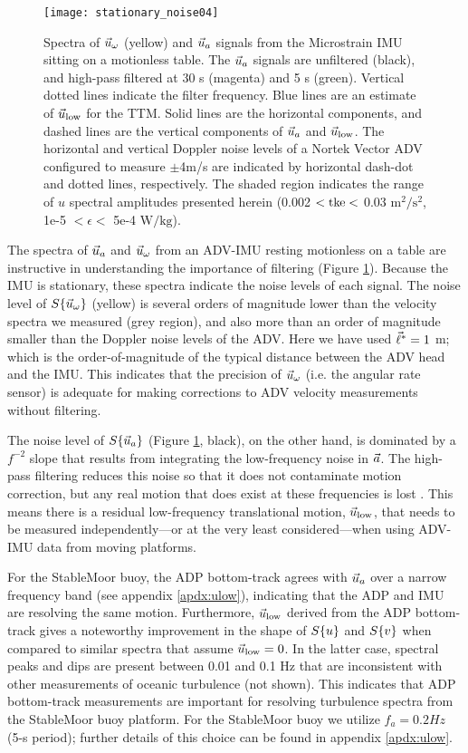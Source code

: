 \begin{figure}
  \centering
  \texttt{[image: stationary\_noise04]}
  \caption{Spectra of $\vec{u}_\omega$ (yellow) and $\vec{u}_a$ signals from the Microstrain IMU sitting on a motionless table. The $\vec{u}_a$ signals are unfiltered (black), and high-pass filtered at 30 s (magenta) and 5 s (green). Vertical dotted lines indicate the filter frequency.  Blue lines are an estimate of $\vec{u}_\mathrm{low}$ for the TTM. Solid lines are the horizontal components, and dashed lines are the vertical components of $\vec{u}_a$ and $\vec{u}_\mathrm{low}$. The horizontal and vertical Doppler noise levels of a Nortek Vector ADV configured to measure $\pm$4m/s are indicated by horizontal dash-dot and dotted lines, respectively. The shaded region indicates the range of $u$ spectral amplitudes presented herein (0.002 $< \mathrm{tke} <$ 0.03 $\mathrm{m^2/s^2}$, 1e-5 $< \epsilon <$ 5e-4 $\mathrm{W/kg}$).}
  \label{fig:stnoise}
\end{figure}

The spectra of $\vec{u}_a$ and $\vec{u}_\omega$ from an ADV-IMU resting motionless on a table are instructive in understanding the importance of filtering (Figure \ref{fig:stnoise}). Because the IMU is stationary, these spectra indicate the noise levels of each signal.  The noise level of $S\{\vec{u}_\omega\}$ (yellow) is several orders of magnitude lower than the velocity spectra we measured (grey region), and also more than an order of magnitude smaller than the Doppler noise levels of the ADV. Here we have used $\vec{\ell}^*=1$ m; which is the order-of-magnitude of the typical distance between the ADV head and the IMU. This indicates that the precision of $\vec{u}_\omega$ (i.e. the angular rate sensor) is adequate for making corrections to ADV velocity measurements without filtering.

The noise level of $S\{\vec{u}_a\}$ (Figure \ref{fig:stnoise}, black), on the other hand, is dominated by a $f^{-2}$ slope that results from integrating the low-frequency noise in ${\vec{a}}$. The high-pass filtering reduces this noise so that it does not contaminate motion correction, but any real motion that does exist at these frequencies is lost \cite[]{EgelandPhD2014, VanZwieten++2015}. This means there is a residual low-frequency translational motion, $\vec{u}_\mathrm{low}$, that needs to be measured independently---or at the very least considered---when using ADV-IMU data from moving platforms. 

For the StableMoor buoy, the ADP bottom-track agrees with $\vec{u}_a$ over a narrow frequency band (see appendix \ref{apdx:ulow}), indicating that the ADP and IMU are resolving the same motion. Furthermore, $\vec{u}_\mathrm{low}$ derived from the ADP bottom-track gives a noteworthy improvement in the shape of $S\{u\}$ and $S\{v\}$ when compared to similar spectra that assume $\vec{u}_\mathrm{low}=0$. In the latter case, spectral peaks and dips are present between 0.01 and 0.1 Hz that are inconsistent with other measurements of oceanic turbulence (not shown). This indicates that ADP bottom-track measurements are important for resolving turbulence spectra from the StableMoor buoy platform. For the StableMoor buoy we utilize $f_a = 0.2 Hz$ (5-s period); further details of this choice can be found in appendix \ref{apdx:ulow}.

